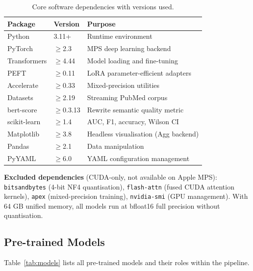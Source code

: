 \documentclass[12pt,a4paper]{article}
\begin{document}
\begin{table}[H]
\centering
\caption{Core software dependencies with versions used.}
\label{tab:software}
\renewcommand{\arraystretch}{1.25}
\begin{tabular}{@{}lll@{}}
\toprule
\textbf{Package}    & \textbf{Version} & \textbf{Purpose} \\
\midrule
Python              & 3.11+       & Runtime environment \\
PyTorch             & $\geq$2.3   & MPS deep learning backend \\
Transformers        & $\geq$4.44  & Model loading and fine-tuning \\
PEFT                & $\geq$0.11  & LoRA parameter-efficient adapters \\
Accelerate          & $\geq$0.33  & Mixed-precision utilities \\
Datasets            & $\geq$2.19  & Streaming PubMed corpus \\
bert-score          & $\geq$0.3.13 & Rewrite semantic quality metric \\
scikit-learn        & $\geq$1.4   & AUC, F1, accuracy, Wilson CI \\
Matplotlib          & $\geq$3.8   & Headless visualisation (Agg backend) \\
Pandas              & $\geq$2.1   & Data manipulation \\
PyYAML              & $\geq$6.0   & YAML configuration management \\
\bottomrule
\end{tabular}
\end{table}

\textbf{Excluded dependencies} (CUDA-only, not available on Apple MPS):
\texttt{bitsandbytes} (4-bit NF4 quantisation), \texttt{flash-attn}
(fused CUDA attention kernels), \texttt{apex} (mixed-precision
training), \texttt{nvidia-smi} (GPU management). With 64 GB unified
memory, all models run at bfloat16 full precision without quantisation.

\subsection{Pre-trained Models}

Table~\ref{tab:models} lists all pre-trained models and their roles within
the pipeline.
\end{document}
